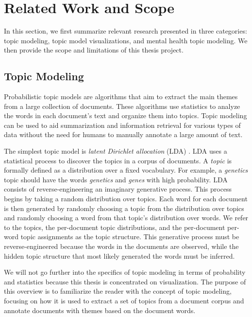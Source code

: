 \chapter{Related Work and Scope}

In this section, we first summarize relevant research presented in three categories: topic modeling, topic model visualizations, and mental health topic modeling. We then provide the scope and limitations of this thesis project.

\section{Topic Modeling}

Probabilistic topic models \cite{blei-topicmodel} are algorithms that aim to extract the main themes from a large collection of documents. These algorithms use statistics to analyze the words in each document's text and organize them into topics. Topic modeling can be used to aid summarization and information retrieval for various types of data without the need for humans to manually annotate a large amount of text.

The simplest topic model is \textit{latent Dirichlet allocation} (LDA) \cite{blei-topicmodel}. LDA uses a statistical process to discover the topics in a corpus of documents. A \textit{topic} is formally defined as a distribution over a fixed vocabulary. For example, a \textit{genetics} topic should have the words \textit{genetics} and \textit{genes} with high probability. LDA consists of reverse-engineering an imaginary generative process. This process begins by taking a random distribution over topics. Each word for each document is then generated by randomly choosing a topic from the distribution over topics and randomly choosing a word from that topic's distribution over words. We refer to the topics, the per-document topic distributions, and the per-document per-word topic assignments as the topic structure. This generative process must be reverse-engineered because the words in the documents are observed, while the hidden topic structure that most likely generated the words must be inferred.

We will not go further into the specifics of topic modeling in terms of probability and statistics because this thesis is concentrated on visualization. The purpose of this overview is to familiarize the reader with the concept of topic modeling, focusing on how it is used to extract a set of topics from a document corpus and annotate documents with themes based on the document words.

